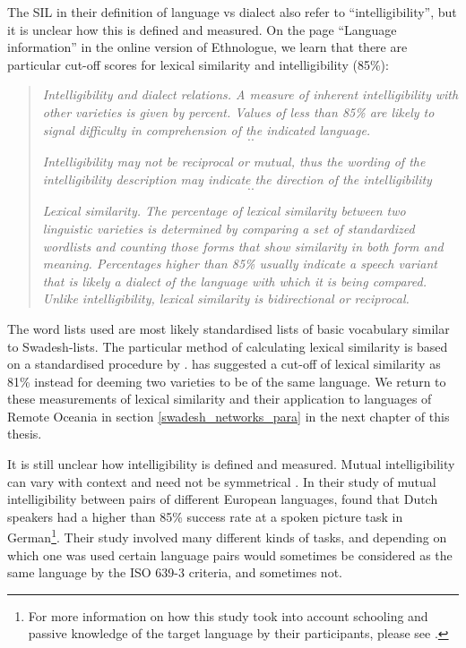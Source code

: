 \documentclass[a4paper,10pt]{article} %
\begin{document}
The SIL in their definition of language vs dialect also refer to ``intelligibility'', but it is unclear how this is defined and measured. On the page ``Language information'' in the online version of Ethnologue, we learn that there are particular cut-off scores for lexical similarity and intelligibility (85\%):


\begin{quotation}
\noindent\emph{Intelligibility and dialect relations. A measure of inherent intelligibility with other varieties is given by percent. Values of less than 85\% are likely to signal difficulty in comprehension of the indicated language.} \[..\]  

\noindent\emph{Intelligibility may not be reciprocal or mutual, thus the wording of the intelligibility description may indicate the direction of the intelligibility}\[..\]

\noindent\emph{Lexical similarity. The percentage of lexical similarity between two linguistic varieties is determined by comparing a set of standardized wordlists and counting those forms that show similarity in both form and meaning. Percentages higher than 85\% usually indicate a speech variant that is likely a dialect of the language with which it is being compared. Unlike intelligibility, lexical similarity is bidirectional or reciprocal.} 
\begin{flushright}\citet{ethnologue2019lgident}\end{flushright}
\end{quotation}

The word lists used are most likely standardised lists of basic vocabulary similar to Swadesh-lists. The particular method of calculating lexical similarity is based on a standardised procedure by \citet{rensch1992calculating}. \citet[326]{swadesh1954perspectives} has suggested a cut-off of lexical similarity as 81\% instead for deeming two varieties to be of the same language. We return to these measurements of lexical similarity and their application to languages of Remote Oceania in section \ref{swadesh_networks_para} in the next chapter of this thesis.

It is still unclear how intelligibility is defined and measured. Mutual intelligibility can vary with context and need not be symmetrical \citep[356]{NETTLE1998}. In their study of mutual intelligibility between pairs of different European languages, \citet{gooskens2017measuring} found that Dutch speakers had a higher than 85\% success rate at a spoken picture task in German\footnote{For more information on how this study took into account schooling and passive knowledge of the target language by their participants, please see \citet{gooskens2017measuring}.}. Their study involved many different kinds of tasks, and depending on which one was used certain language pairs would sometimes be considered as the same language by the ISO 639-3 criteria, and sometimes not.
\end{document}
